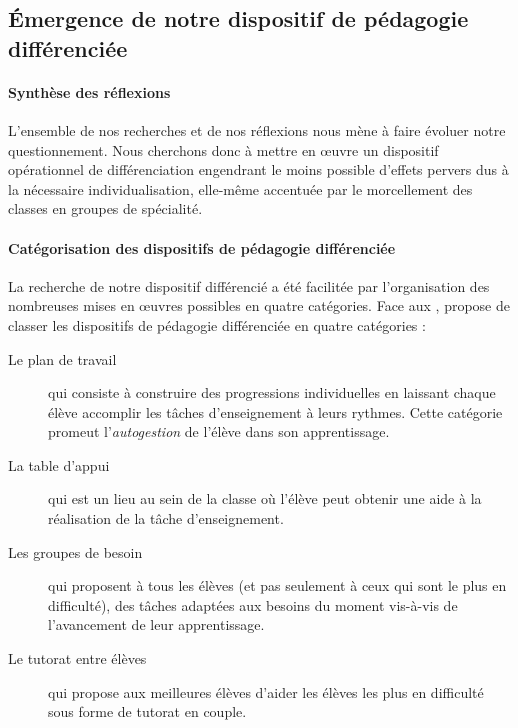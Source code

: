 \subsection{Émergence de notre dispositif de pédagogie différenciée}

\paragraph{Synthèse des réflexions}
%
%
L'ensemble de nos recherches et de nos réflexions nous mène à faire évoluer notre questionnement. Nous cherchons donc à mettre en œuvre un dispositif opérationnel de différenciation engendrant le moins possible d'effets pervers dus à la nécessaire individualisation, elle-même accentuée par le morcellement des classes en groupes de spécialité.



\paragraph{Catégorisation des dispositifs de pédagogie différenciée}
%
%
La recherche de notre dispositif différencié a été facilitée par l'organisation des nombreuses mises en œuvres possibles en quatre catégories. Face aux \textcite{réponses concrètes [qui] demeurent quant à elle plurielles}, \cite{forget_penser_2018} propose de classer les dispositifs de pédagogie différenciée en quatre catégories :

\begin{description}
	\item [Le plan de travail] qui consiste à construire des progressions individuelles en laissant chaque élève accomplir les tâches d'enseignement à leurs rythmes. Cette catégorie promeut l'\textit{autogestion} de l'élève dans son apprentissage.
	\item [La table d'appui] qui est un lieu au sein de la classe où l'élève peut obtenir une aide à la réalisation de la tâche d'enseignement.
	\item [Les groupes de besoin] qui proposent à tous les élèves (et pas seulement à ceux qui sont le plus en difficulté), des tâches adaptées aux besoins du moment vis-à-vis de l'avancement de leur apprentissage.
	\item [Le tutorat entre élèves] qui propose aux meilleures élèves d'aider les élèves les plus en difficulté sous forme de tutorat en couple.
\end{description}



